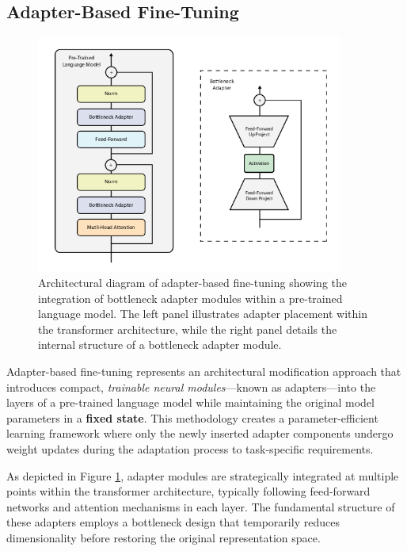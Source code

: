 \subsection{Adapter-Based Fine-Tuning}
\begin{figure}[ht]
\centering
\includegraphics[width=0.9\textwidth]{img/chap05/5.2.2.png}
\caption{Architectural diagram of adapter-based fine-tuning showing the integration of bottleneck adapter modules within a pre-trained language model. The left panel illustrates adapter placement within the transformer architecture, while the right panel details the internal structure of a bottleneck adapter module.}
\label{fig:adapter-fine-tuning}
\end{figure}

Adapter-based fine-tuning represents an architectural modification approach that introduces compact, \textit{trainable neural modules}—known as adapters—into the layers of a pre-trained language model while maintaining the original model parameters in a \textbf{fixed state}. This methodology creates a parameter-efficient learning framework where only the newly inserted adapter components undergo weight updates during the adaptation process to task-specific requirements.

As depicted in Figure \ref{fig:adapter-fine-tuning}, adapter modules are strategically integrated at multiple points within the transformer architecture, typically following feed-forward networks and attention mechanisms in each layer. The fundamental structure of these adapters employs a bottleneck design that temporarily reduces dimensionality before restoring the original representation space.

